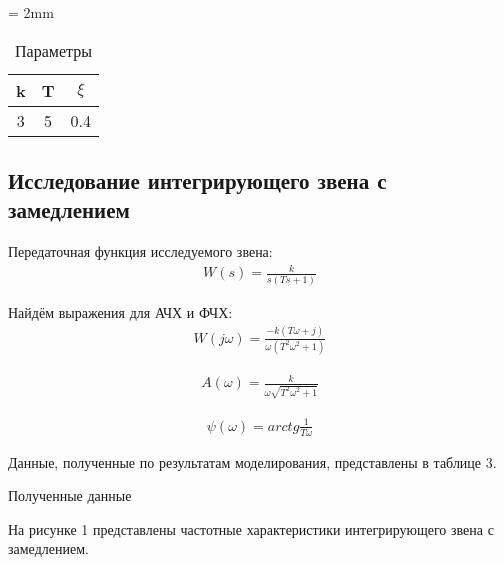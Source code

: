 \documentclass[a4paper, 11pt]{article}
\begin{document}
\begin{table}[h!]
    \tabulinesep = 2mm
    	\caption{Параметры}\label{tab:perflogcross}
    	\begin{tabular}{|c|c|c|}
    		\hline
        	k & T & $\xi$ \\ \hline
        	3 & 5 & 0.4 \\
        	\hline
    	\end{tabular}
\end{table}

\newpage
\begin{center}
	\section{Исследование интегрирующего звена с замедлением}
\end{center}

\par 
Передаточная функция исследуемого звена:
\begin{align}
	W(s)=\frac{k}{s(Ts+1)}
\end{align}
\par 
Найдём выражения для АЧХ и ФЧХ:
\begin{align}
	W(j\omega)=\frac{-k(T\omega+j)}{\omega(T^2\omega^2+1)}
\end{align}

\begin{align}
	A(\omega)=\frac{k}{\omega\sqrt{T^2\omega^2+1}}
\end{align}
	
\begin{align}
	\psi(\omega)=arctg\frac{1}{T\omega}
\end{align}

\newpage
\par 
Данные, полученные по результатам моделирования, представлены в таблице 3.
\begin{table}[h!]
    \begin{threeparttable}
        \caption{Полученные данные} \label{tab:perflogcross}
    \end{threeparttable}
\end{table}

\newpage
\par 
На рисунке 1 представлены частотные характеристики интегрирующего звена с замедлением.
\end{document}

